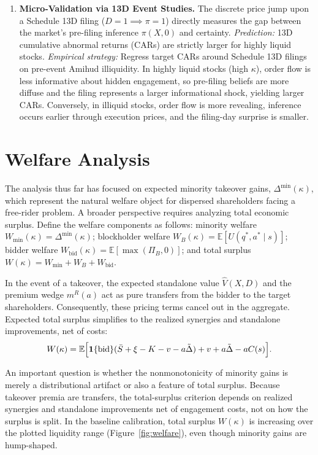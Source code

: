 \documentclass[11pt]{article}
\newcommand{\E}{\mathbb{E}}
\newcommand{\1}{\mathbf{1}}
\begin{document}
\begin{enumerate}[label=\textbf{\arabic*.}]
\item \textbf{Micro-Validation via 13D Event Studies.} The discrete price jump upon a Schedule 13D filing ($D=1 \implies \pi=1$) directly measures the gap between the market's pre-filing inference $\pi(X,0)$ and certainty.
\emph{Prediction:} 13D cumulative abnormal returns (CARs) are strictly larger for highly liquid stocks.
\emph{Empirical strategy:} Regress target CARs around Schedule 13D filings on pre-event Amihud illiquidity. In highly liquid stocks (high $\kappa$), order flow is less informative about hidden engagement, so pre-filing beliefs are more diffuse and the filing represents a larger informational shock, yielding larger CARs. Conversely, in illiquid stocks, order flow is more revealing, inference occurs earlier through execution prices, and the filing-day surprise is smaller.
\end{enumerate}

\section{Welfare Analysis}
\label{sec:welfare}

The analysis thus far has focused on expected minority takeover gains, $\Delta^{\min}(\kappa)$, which represent the natural welfare object for dispersed shareholders facing a free-rider problem. A broader perspective requires analyzing total economic surplus. Define the welfare components as follows: minority welfare $W_{\text{min}}(\kappa) = \Delta^{\min}(\kappa)$; blockholder welfare $W_B(\kappa) = \E[U(q^*, a^* \mid s)]$; bidder welfare $W_{\text{bid}}(\kappa) = \E[\max(\Pi_B, 0)]$; and total surplus $W(\kappa) = W_{\text{min}} + W_B + W_{\text{bid}}$.

In the event of a takeover, the expected standalone value $\hat{V}(X,D)$ and the premium wedge $m^{R}(a)$ act as pure transfers from the bidder to the target shareholders. Consequently, these pricing terms cancel out in the aggregate. Expected total surplus simplifies to the realized synergies and standalone improvements, net of costs:
\begin{equation}
W(\kappa) = \E\Bigl[ \1\{\text{bid}\} (\bar{S} + \xi - K - v - a\tilde{\Delta}) + v + a\tilde{\Delta} - a C(s) \Bigr].
\end{equation}

An important question is whether the nonmonotonicity of minority gains is merely a distributional artifact or also a feature of total surplus. Because takeover premia are transfers, the total-surplus criterion depends on realized synergies and standalone improvements net of engagement costs, not on how the surplus is split. In the baseline calibration, total surplus $W(\kappa)$ is increasing over the plotted liquidity range (Figure~\ref{fig:welfare}), even though minority gains are hump-shaped.
\end{document}
